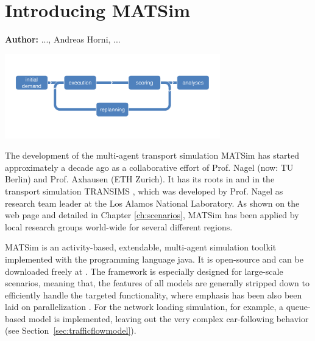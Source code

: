 \chapter{Introducing MATSim}
\label{ch:introducing}
\hfill \textbf{Author:} ..., Andreas Horni, ...

\begin{center} \includegraphics[width=0.7\textwidth, angle=0]{figures/matsimcycle.pdf} \end{center}


The development of the multi-agent transport simulation MATSim \citep[][]{MATSIM-T_Webpage_2014, BalmerEtAl_TRR_2006} has started approximately a decade ago as a collaborative effort of Prof. Nagel (now: TU Berlin) and Prof. Axhausen (ETH Zurich). It has its roots in \citet[][]{Axhausen_PhDThesis_1988} and in the transport simulation TRANSIMS \citep[][]{RaneyEtAl_LNCS_2002}, which was developed by Prof. Nagel as research team leader at the Los Alamos National Laboratory. As shown on the web page \citep[][]{MATSIM-T-Scenarios_Webpage_2015} and detailed in Chapter \ref{ch:scenarios}, MATSim has been applied by local research groups world-wide for several different regions.

MATSim is an activity-based, extendable, multi-agent simulation toolkit implemented with the programming language \gls{java}. It is open-source and can be downloaded freely at \citep[][]{MATSIM-T_Webpage_2015, SourceForge_Webpage_2015}. The framework is especially designed for large-scale scenarios, meaning that, the features of all models are generally stripped down to efficiently handle the targeted functionality, where emphasis has been also been laid on parallelization \citep[e.g.,][]{Dobler_TechRep_IVT_2011, Charypar_PhDThesis_2008}. For the network loading simulation, for example, a queue-based model is implemented, leaving out the very complex car-following behavior (see Section~\ref{sec:trafficflowmodel}).

